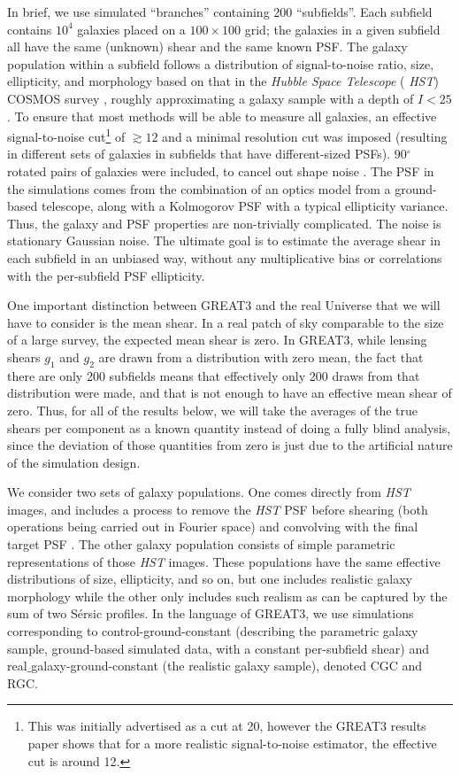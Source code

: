 \documentclass[iop]{emulateapj}
\begin{document}
In brief, we use simulated ``branches'' containing 200 ``subfields''.
Each subfield contains $10^4$ galaxies placed on a $100\times 100$
grid; the galaxies in a given subfield all have the same (unknown)
shear and the same known PSF.  The galaxy population within a subfield
follows a distribution of signal-to-noise ratio, size, ellipticity,
and morphology based on that in the {\it Hubble Space Telescope} ({\it
  HST}) COSMOS survey
\citep{2007ApJS..172..196K,2007ApJS..172....1S,2007ApJS..172...38S},
roughly approximating a galaxy sample with a depth of $I<25$.  To
ensure that most methods will be able to measure all galaxies, an
effective signal-to-noise cut\footnote{This was initially advertised as a cut at 20, however the
  GREAT3 results paper shows that for a more realistic signal-to-noise estimator, the effective cut
  is around 12.} of $\gtrsim 12$ and a minimal resolution
cut was imposed (resulting in different sets of galaxies in subfields
that have different-sized PSFs).  90$^\circ$ rotated pairs of galaxies
were included, to cancel out shape noise \citep{2007MNRAS.376...13M}.
The PSF in the simulations comes from the combination of an optics
model from a ground-based telescope, along with a Kolmogorov PSF with
a typical ellipticity variance.  Thus, the galaxy and PSF properties
are non-trivially complicated.  The noise is stationary Gaussian
noise.  The ultimate goal is to estimate the average shear in each
subfield in an unbiased way, without any multiplicative bias or
correlations with the per-subfield PSF ellipticity.

One important distinction between GREAT3 and the real Universe that we
will have to consider is the mean shear.  In a real patch of sky
comparable to the size of a large survey, the expected mean shear is
zero.  In GREAT3, while lensing shears $g_1$ and $g_2$ are drawn from
a distribution with zero mean, the fact that there are only 200
subfields means that effectively only 200 draws from that distribution
were made, and that is not enough to have an effective mean shear of
zero.  Thus, for all of the results below, we will take the averages
of the true shears per component as a known quantity instead of doing
a fully blind analysis, since the deviation of those quantities from
zero is just due to the artificial nature of the simulation design.

We consider two sets of galaxy populations.  One comes directly from
{\it HST} images, and includes a process to remove the {\it HST} PSF before
shearing (both operations being carried out in Fourier space) and
convolving with the final target PSF \citep{2012MNRAS.420.1518M}.  The
other galaxy population consists of simple parametric representations
of those {\it HST} images.  These populations have the same effective
distributions of size, ellipticity, and so on, but one includes
realistic galaxy morphology while the other only includes such realism
as can be captured by the sum of two S\'{e}rsic profiles.  In the
language of GREAT3, we use simulations corresponding to
control-ground-constant (describing the parametric galaxy sample,
ground-based simulated data, with a constant per-subfield shear) and
real$\_$galaxy-ground-constant (the realistic galaxy sample), denoted
CGC and RGC.
\end{document}
